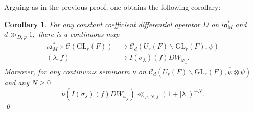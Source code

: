 \documentclass[12pt]{amsart}
\newtheorem{thm}{Theorem}[section]
\newtheorem{cor}[thm]{Corollary}
\theoremstyle{remark}
\numberwithin{equation}{section}
\newcommand{\GL}{\mathrm{GL}}
\newcommand{\lto}{\longrightarrow}
\newcommand{\quash}[1]{}
\theoremstyle{definition}
\numberwithin{equation}{subsection}
\begin{document}
Arguing as in the previous proof, one obtains the following corollary:
\begin{cor} \label{cor:unif} For any constant 
coefficient differential operator $D$ on $i\mathfrak{a}_M^*$ and $d \gg_{D,\varphi} 1,$ there is a continuous map
   \begin{align*}
   i\mathfrak{a}_M^\ast \times \mathcal{C}(\GL_r(F)) &\lto \mathcal{C}_d(U_r(F) \backslash \GL_r(F),\psi)\\
   (\lambda,f) &\longmapsto I(\sigma_{\lambda})(f)DW_{\varphi_\lambda}.
   \end{align*}
Moreover, for any continuous seminorm $\nu$ on $\mathcal{C}_d(U_r(F) \backslash \GL_r(F),\overline{\psi} \otimes \psi)$ and any $N \geq 0$
$$
\nu(I(\sigma_{\lambda})(f)DW_{\varphi_\lambda}) \ll_{\varphi,N,f}(1+|\lambda|)^{-N}.
$$ \qed
\end{cor}
\quash{

For the purposes of the following results, for $g \in \GL_r(F)$ write $g=nak$ with $(n,a,k) \in U_r(F) \times T_r(F) \times K_r.$  
\begin{thm}   \label{thm:uniform:bound}
Let $M,N>0$. There exists $d>0$ and a continuous seminorm $\nu_{M,N,d}$ on $\mathcal{C}(\GL_r(F))$ such that one has
\begin{align*}
   &|\overline{W}_{\varphi_{\lambda}}(n_1a_1k_1)I(\sigma_\lambda)(f^\vee)W_{\varphi_{\lambda}}(n_2a_2k_2)| \ll_{\sigma,\varphi} \frac{\nu_{M,N,d}(f) \delta_{B_r}^{1/2}(a_1a_2)\sigma^d(a_1)\sigma^d(a_2)}{(1+|\lambda|)^M\prod_{i=1}^{r-1}(1+|\alpha_i(a_1)|)^{N}(1+|\alpha_i(a_2)|)^{N}}
\end{align*}
for all $\lambda \in i\mathfrak{a}_M^*.$
\end{thm}
\begin{proof}
The space $\mathcal{C}(\GL_r(F))$ is an LF-space (even a Fr\'echet space in the Archimedean case).  Thus the uniform boundness principle is valid for it \cite[\S 33]{Treves}.  It suffices to establish the estimate with $\nu_{M,N,d}(f)$ replaced by an unspecified constant.

In view of Lemma \ref{lem:C:gauge} and using notation as in that lemma, Proposition \ref{prop:unif} implies that there is a $d>0$ such that
\begin{align*}
&|\overline{W}_{\varphi_{\lambda}}(n_1a_1k_1)I(\sigma_\lambda)(f^\vee)W_{\varphi_{\lambda}}(n_2a_2k_2)|\\
& \leq \nu_{N,d}(\overline{W}_{\varphi_{\lambda}}I(\sigma_\lambda)(f)W_{\varphi_{\lambda}}) \frac{\delta_{B_r}^{1/2}(a_1a_2)\sigma(a_1)^d\sigma(a_2)^d}{\prod_{i=1}^{r-1}(1+|\alpha_i(a_1)|)^{N}(1+|\alpha_i(a_2)|)^{N}}\\
&\ll_{M,N,d} \frac{\delta_{B_r}^{1/2}(a_1a_2)\sigma(a_1)^d\sigma(a_2)^d}{(1+|\lambda|)^M\prod_{i=1}^{r-1}(1+|\alpha_i(a_1)|)^{N}(1+|\alpha_i(a_2)|)^{N}}.
\end{align*}
\end{proof}}
\end{document}
